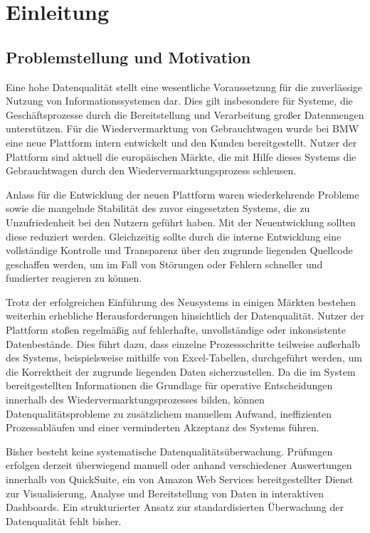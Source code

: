 \documentclass[../main.tex]{subfiles}
\begin{document}
\chapter{Einleitung}
\label{chap:einleitung}

\section{Problemstellung und Motivation}

Eine hohe Datenqualität stellt eine wesentliche Voraussetzung für die zuverlässige Nutzung von Informationssystemen dar. Dies gilt insbesondere für Systeme, die Geschäftsprozesse durch die Bereitstellung und Verarbeitung großer Datenmengen unterstützen. Für die Wiedervermarktung von Gebrauchtwagen wurde bei BMW eine neue Plattform intern entwickelt und den Kunden bereitgestellt. Nutzer der Plattform sind aktuell die europäischen Märkte, die mit Hilfe dieses Systems die Gebrauchtwagen durch den Wiedervermarktungsprozess schleusen.

Anlass für die Entwicklung der neuen Plattform waren wiederkehrende Probleme sowie die mangelnde Stabilität des zuvor eingesetzten Systems, die zu Unzufriedenheit bei den Nutzern geführt haben. Mit der Neuentwicklung sollten diese reduziert werden. Gleichzeitig sollte durch die interne Entwicklung eine vollständige Kontrolle und Transparenz über den zugrunde liegenden Quellcode geschaffen werden, um im Fall von Störungen oder Fehlern schneller und fundierter reagieren zu können.

Trotz der erfolgreichen Einführung des Neusystems in einigen Märkten bestehen weiterhin erhebliche Herausforderungen hinsichtlich der Datenqualität. Nutzer der Plattform stoßen regelmäßig auf fehlerhafte, unvollständige oder inkonsistente Datenbestände. Dies führt dazu, dass einzelne Prozessschritte teilweise außerhalb des Systems, beispielsweise mithilfe von Excel-Tabellen, durchgeführt werden, um die Korrektheit der zugrunde liegenden Daten sicherzustellen. Da die im System bereitgestellten Informationen die Grundlage für operative Entscheidungen innerhalb des Wiedervermarktungsprozesses bilden, können Datenqualitätsprobleme zu zusätzlichem manuellem Aufwand, ineffizienten Prozessabläufen und einer verminderten Akzeptanz des Systems führen.

Bisher besteht keine systematische Datenqualitätsüberwachung. Prüfungen erfolgen derzeit überwiegend manuell oder anhand verschiedener Auswertungen innerhalb von QuickSuite, ein von Amazon Web Services bereitgestellter Dienst zur Visualisierung, Analyse und Bereitstellung von Daten in interaktiven Dashboards. Ein strukturierter Ansatz zur standardisierten Überwachung der Datenqualität fehlt bisher. 
\end{document}
